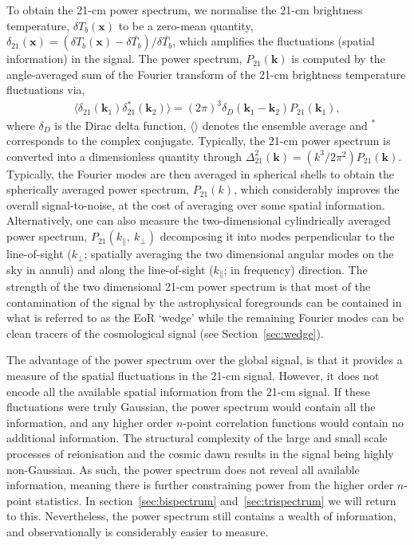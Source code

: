 To obtain the 21-cm power spectrum, we normalise the 21-cm brightness temperature, $\delta T_{b}(\mathbf{x})$ to be a zero-mean quantity, $\delta_{21}(\mathbf{x}) = (\delta T_{b}(\mathbf{x}) - \delta\bar{T_{b}})/\delta\bar{T_{b}}$, which amplifies the fluctuations (spatial information) in the signal. The power spectrum, $P_{21}(\mathbf{k})$ is computed by the angle-averaged sum of the Fourier transform of the 21-cm brightness temperature fluctuations via,
\begin{eqnarray}
\langle \delta_{21}(\mathbf{k}_{1})\delta^{\ast}_{21}(\mathbf{k}_{2}) \rangle = (2\pi)^{3}\delta_{D}( \mathbf{k}_{1} - \mathbf{k}_{2})P_{21}(\mathbf{k}_{1}),
\end{eqnarray}
where $\delta_{D}$ is the Dirac delta function, $\langle \rangle$ denotes the ensemble average and $^\ast$ corresponds to the complex conjugate. Typically, the 21-cm power spectrum is converted into a dimensionless quantity through $\Delta^{2}_{21}(\mathbf{k}) = (k^{3}/2\pi^{2})P_{21}(\mathbf{k})$. Typically, the Fourier modes are then averaged in spherical shells to obtain the spherically averaged power spectrum, $P_{21}(k)$, which considerably improves the overall signal-to-noise, at the cost of averaging over some spatial information. Alternatively, one can also measure the two-dimensional cylindrically averaged power spectrum, $P_{21}(k_\parallel,~k_\perp)$ decomposing it into modes perpendicular to the line-of-sight ($k_\perp$; spatially averaging the two dimensional angular modes on the sky in annuli) and along the line-of-sight ($k_\parallel$; in frequency) direction. The strength of the two dimensional 21-cm power spectrum is that most of the contamination of the signal by the astrophysical foregrounds can be contained in what is referred to as the EoR `wedge' while the remaining Fourier modes can be clean tracers of the cosmological signal (see Section~\ref{sec:wedge}).

The advantage of the power spectrum over the global signal, is that it provides a measure of the spatial fluctuations in the 21-cm signal. However, it does not encode all the available spatial information from the 21-cm signal. If these fluctuations were truly Gaussian, the power spectrum would contain all the information, and any higher order $n$-point correlation functions would contain no additional information. The structural complexity of the large and small scale processes of reionisation and the cosmic dawn results in the signal being highly non-Gaussian. As such, the power spectrum does not reveal all available information, meaning there is further constraining power from the higher order $n$-point statistics. In section~\ref{sec:bispectrum} and~\ref{sec:trispectrum}  we will return to this. Nevertheless, the power spectrum still contains a wealth of information, and observationally is considerably easier to measure.

